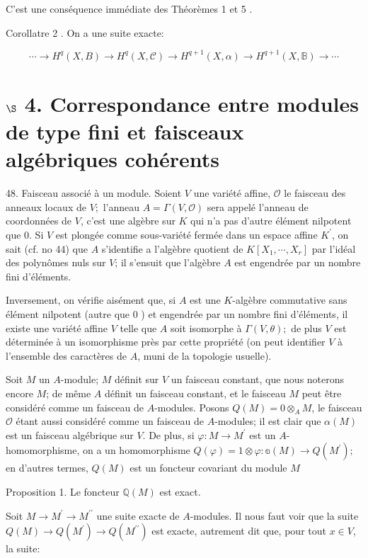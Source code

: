 C'est une conséquence immédiate des Théorèmes 1 et 5 .

Corollatre 2 . On a une suite exacte:

$$
\cdots \rightarrow H^{q}(X, B) \rightarrow H^{q}(X, \mathcal{C}) \rightarrow H^{q+1}(X, \alpha) \rightarrow H^{q+1}(X, \mathbb{B}) \rightarrow \cdots
$$

\section{$\S$ 4. Correspondance entre modules de type fini et faisceaux algébriques cohérents}

48. Faisceau associé à un module. Soient $V$ une variété affine, $\mathcal{O}$ le faisceau des anneaux locaux de $V ;$ l'anneau $A=\Gamma(V, \mathcal{O})$ sera appelé l'anneau de coordonnées de $V$, c'est une algèbre sur $K$ qui n'a pas d'autre élément nilpotent que 0. Si $V$ est plongée comme sous-variété fermée dans un espace affine $K^{\prime}$, on sait (cf. no 44) que $A$ s'identifie a l'algèbre quotient de $K\left[X_{1}, \cdots, X_{r}\right]$ par l'idéal des polynômes nuls sur $V$; il s'ensuit que l'algèbre $A$ est engendrée par un nombre fini d'éléments.

Inversement, on vérifie aisément que, si $A$ est une $K$-algèbre commutative sans élément nilpotent (autre que 0 ) et engendrée par un nombre fini d'éléments, il existe une variété affine $V$ telle que $A$ soit isomorphe à $\Gamma(V, \theta) ;$ de plus $V$ est déterminée à un isomorphisme près par cette propriété (on peut identifier $V$ à l'ensemble des caractères de $A$, muni de la topologie usuelle).

Soit $M$ un $A$-module; $M$ définit sur $V$ un faisceau constant, que nous noterons encore $M$; de même $A$ définit un faisceau constant, et le faisceau $M$ peut être considéré comme un faisceau de $A$-modules. Posons $Q(M)=0 \otimes_{A} M$, le faisceau $\mathcal{O}$ étant aussi considéré comme un faisceau de $A$-modules; il est clair que $\alpha(M)$ est un faisceau algébrique sur $V$. De plus, si $\varphi: M \rightarrow M^{\prime}$ est un $A$-homomorphisme, on a un homomorphisme $Q(\varphi)=1 \otimes \varphi: \mathbb{a}(M) \rightarrow Q\left(M^{\prime}\right) ;$ en d'autres termes, $Q(M)$ est un foncteur covariant du module $M$

Proposition 1. Le foncteur $\mathbb{Q}(M)$ est exact.

Soit $M \rightarrow M^{\prime} \rightarrow M^{\prime \prime}$ une suite exacte de $A$-modules. Il nous faut voir que la suite $Q(M) \rightarrow Q\left(M^{\prime}\right) \rightarrow Q\left(M^{\prime \prime}\right)$ est exacte, autrement dit que, pour tout $x \in V$, la suite:

